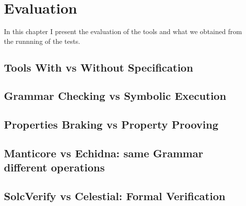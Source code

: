 
\chapter{Evaluation}
\label{ch:Evaluation}

In this chapter I present the evaluation of the tools and what we obtained from the runnning of the tests.


\section{Tools With vs Without Specification}

\section{Grammar Checking vs Symbolic Execution}

\section{Properties Braking vs Property Prooving}

\section{Manticore vs Echidna: same Grammar different operations}


\section{SolcVerify vs Celestial: Formal Verification}
